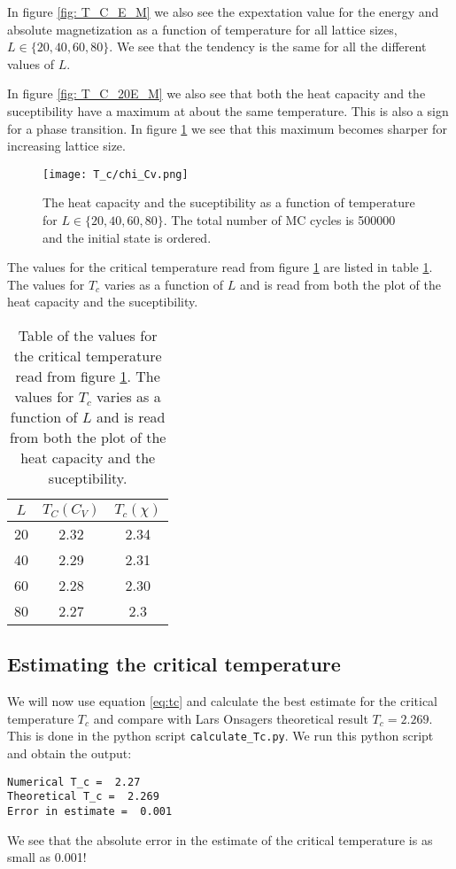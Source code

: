 \documentclass[11pt,a4wide]{article}
\begin{document}
In figure \ref{fig:  T_C_E_M} we also see the expextation value for the energy and absolute magnetization as a function of temperature for all lattice sizes, $L\in \{20, 40, 60, 80\}$. We see that the tendency is the same for all the different values of $L$. 

In figure \ref{fig:  T_C_20E_M} we also see that both the heat capacity and the suceptibility have a maximum at about the same temperature. This is also a sign for a phase transition. In figure \ref{fig:  T_C_rest} we see that this maximum becomes sharper for increasing lattice size. 

\begin{figure}[htp]
\texttt{[image: T\_c/chi\_Cv.png]}
\caption{The heat capacity and the suceptibility as a function of temperature for $L\in \{20, 40, 60, 80\}$. The total number of MC cycles is 500000 and the initial state is ordered.}
\centering
\label{fig:  T_C_rest}
\end{figure}

The values for the critical temperature read from figure \ref{fig:  T_C_rest} are listed in table \ref{tab: T_c}. The values for $T_c$ varies as a function of $L$ and is read from both the plot of the heat capacity and the suceptibility.

\begin{table}
\centering
\caption{Table of the values for the critical temperature read from figure \ref{fig:  T_C_rest}. The values for $T_c$ varies as a function of $L$ and is read from both the plot of the heat capacity and the suceptibility.}
\begin{tabular}{|c|c|c|}
\hline 
$L$ & $T_C (C_V)$ & $T_c(\chi)$ \\ 
\hline 
20 & 2.32 & 2.34 \\ 
\hline 
40 & 2.29 & 2.31 \\ 
\hline 
60 & 2.28 & 2.30 \\ 
\hline 
80 & 2.27 & 2.3 \\ 
\hline 
\end{tabular}
\label{tab: T_c}
\end{table}

\subsection{Estimating the critical temperature}
We will now use equation \ref{eq:tc} and calculate the best estimate for the critical temperature $T_c$ and compare with Lars Onsagers theoretical result $T_c = 2.269$. This is done in the python script \texttt{calculate\_Tc.py}. We run this python script and obtain the output:
\begin{lstlisting}
Numerical T_c =  2.27
Theoretical T_c =  2.269
Error in estimate =  0.001
\end{lstlisting}
We see that the absolute error in the estimate of the critical temperature is as small as 0.001! 
\end{document}
